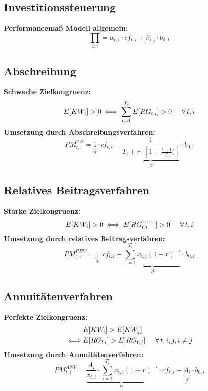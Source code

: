 \documentclass[leqno]{scrartcl}
\begin{document}
\begin{multicols}{4}
\section{Investitionssteuerung}
\textbf{Performancemaß Modell allgemein:}
  \begin{equation*}
    \prod_{t,i} = \alpha_{t,i} \cdot cf_{t,i} + \beta_{t,i} \cdot b_{0,i}
  \end{equation*}

\subsection{Abschreibung}
\textbf{Schwache Zielkongruenz:}
  \begin{equation*}
    E[KW_i] > 0 \iff \sum^{T_i}_{t=1} E[RG_{t,i}] > 0 \hspace{0.5cm} \forall\, t,i
  \end{equation*}
\textbf{Umsetzung durch Abschreibungsverfahren:}
  \begin{equation*}
    PM^{AB}_{t,i} = \underbrace{1}_{\alpha} \cdot cf_{t,i} - \underbrace{\frac{1}{T_i+r \cdot\left[1-\frac{t-1}{T_i})\right]}}_{\beta} \cdot b_{0,i}
  \end{equation*}

\subsection{Relatives Beitragsverfahren}
\textbf{Starke Zielkongruenz:}
  \begin{equation*}
    E[KW_i] > 0 \iff E[RG_{t,i}^{\color{lightgray}RBV\color{black}}] > 0 \hspace{0.5cm} \forall\, t,i
  \end{equation*}
\textbf{Umsetzung durch relatives Beitragsverfahren:}
  \begin{equation*}
    PM^{RBV}_{t,i} = \underbrace{1}_{\alpha} \cdot cf_{t,i} - \underbrace{\sum^{T_i}_{\tau=1}x_{t,i}(1+r)^{-\tau}}_{\beta} \cdot b_{0,i}
  \end{equation*}

\subsection{Annuitätenverfahren}
\textbf{Perfekte Zielkongruenz:}
  \begin{align*}
    &E[KW_i] > E[KW_j]\\
    \iff &E[RG_{t,i}] > E[RG_{t,j}] \hspace{0.5cm} \forall\, t,i,j,i \neq j
  \end{align*}
\textbf{Umsetzung durch Annuitätenverfahren:}
  \begin{equation*}
        PM^{ANV}_{t,i} = \underbrace{\frac{A_i}{x_{t,i}} \cdot \sum^{T_i}_{\tau=1}x_{t,i}(1+r)^{-\tau}}_{\alpha} \cdot cf_{t,i} - \underbrace{A_i}_{\beta} \cdot b_{0,i}
  \end{equation*}


\end{multicols}
\end{document}
